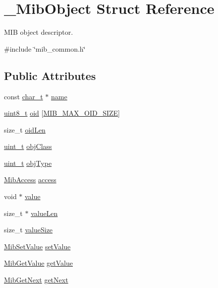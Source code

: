 \hypertarget{struct__MibObject}{}\section{\+\_\+\+Mib\+Object Struct Reference}
\label{struct__MibObject}


M\+IB object descriptor.  




{\ttfamily \#include \char`\"{}mib\+\_\+common.\+h\char`\"{}}

\subsection*{Public Attributes}
\begin{DoxyCompactItemize}
\item 
const \hyperlink{compiler__port_8h_a40bb5262bf908c328fbcfbe5d29d0201}{char\+\_\+t} $\ast$ \hyperlink{struct__MibObject_a09032e1c6636e7e232f5c21df3e7a331}{name}
\item 
\hyperlink{stdint_8h_aba7bc1797add20fe3efdf37ced1182c5}{uint8\+\_\+t} \hyperlink{struct__MibObject_a966a91f480cb9e111ab4f739c921ddc5}{oid} \mbox{[}\hyperlink{mib__common_8h_a70ab69e5198d8438346981c7b26dabca}{M\+I\+B\+\_\+\+M\+A\+X\+\_\+\+O\+I\+D\+\_\+\+S\+I\+ZE}\mbox{]}
\item 
size\+\_\+t \hyperlink{struct__MibObject_a1ccab054503d3291712eacaad5ca8bd8}{oid\+Len}
\item 
\hyperlink{compiler__port_8h_a12a1e9b3ce141648783a82445d02b58d}{uint\+\_\+t} \hyperlink{struct__MibObject_ad70ebfaaada8db2560dbe2f3dafeedd8}{obj\+Class}
\item 
\hyperlink{compiler__port_8h_a12a1e9b3ce141648783a82445d02b58d}{uint\+\_\+t} \hyperlink{struct__MibObject_aa77da1505d2929cd5a32d3050e7d924a}{obj\+Type}
\item 
\hyperlink{mib__common_8h_a801861d3d59b941b484ed18b4ea27317}{Mib\+Access} \hyperlink{struct__MibObject_a85b02ef43504ca1be90f74cae09df6b0}{access}
\item 
void $\ast$ \hyperlink{struct__MibObject_a4309d51a49efdf9609f2539827825dda}{value}
\item 
size\+\_\+t $\ast$ \hyperlink{struct__MibObject_ac28bea8e33a7482287f12f201f937710}{value\+Len}
\item 
size\+\_\+t \hyperlink{struct__MibObject_a7593675d0c742ab5b5cc6256a38eff07}{value\+Size}
\item 
\hyperlink{mib__common_8h_a4bceed7ee27e3ff74aab6f92f774e9ac}{Mib\+Set\+Value} \hyperlink{struct__MibObject_ae8ed71dfa3bb37ecdb2459ba47bb4ace}{set\+Value}
\item 
\hyperlink{mib__common_8h_ac4b16933ae43d7a37b656659c12c9bf3}{Mib\+Get\+Value} \hyperlink{struct__MibObject_a9b2532080795955810873fcc278335ba}{get\+Value}
\item 
\hyperlink{mib__common_8h_a1bb057e88d7214de1f03dc4c8a79f64a}{Mib\+Get\+Next} \hyperlink{struct__MibObject_a78c4fe0634c680d8476066c27fa2e42a}{get\+Next}
\end{DoxyCompactItemize}


